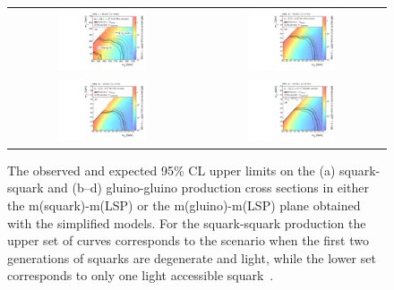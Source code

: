 \begin{figure}[!t]
  \centering
  \begin{tabular}{cc}
                \includegraphics[width=0.49\textwidth]{figures/RA2_Limit1.pdf} &
                \includegraphics[width=0.49\textwidth]{figures/RA2_Limit2.pdf} \\
                \includegraphics[width=0.49\textwidth]{figures/RA2_Limit3.pdf} &
                \includegraphics[width=0.49\textwidth]{figures/RA2_Limit4.pdf} \\
  \end{tabular}
\caption{The observed and expected 95\% CL upper limits on the (a) squark-squark and (b--d) gluino-gluino production cross sections in either the m(squark)-m(LSP) or the m(gluino)-m(LSP) plane obtained with the simplified models. For the squark-squark production the upper set of curves corresponds to the scenario when the first two generations of squarks are degenerate and light, while the lower set corresponds to only one light accessible squark~\cite{Chatrchyan:2014lfa}.} 
  \label{fig:ra2_limits}
\end{figure}
